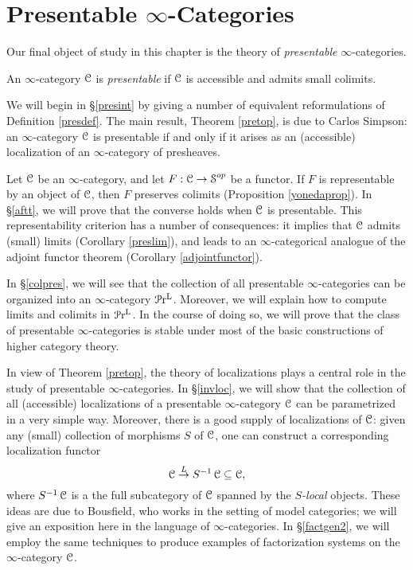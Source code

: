 \section{Presentable $\infty$-Categories}\label{c5s6}

Our final object of study in this chapter is the theory of {\em presentable} $\infty$-categories.

\begin{definition}\label{presdef}
An $\infty$-category $\operatorname{\mathcal{C}}$ is {\it presentable} if $\operatorname{\mathcal{C}}$ is accessible and admits small colimits.
\end{definition}

We will begin in \S \ref{presint} by giving a number of equivalent reformulations of Definition \ref{presdef}. The main result, Theorem \ref{pretop}, is due to Carlos Simpson: an $\infty$-category $\operatorname{\mathcal{C}}$ is presentable if and only if it arises as an (accessible) localization of an $\infty$-category of presheaves. 

Let $\operatorname{\mathcal{C}}$ be an $\infty$-category, and let $F: \operatorname{\mathcal{C}} \rightarrow \operatorname{\mathcal{S}}^{op}$ be a functor. If $F$ is representable by an object of $\operatorname{\mathcal{C}}$, then $F$ preserves colimits (Proposition \ref{yonedaprop}). In \S \ref{aftt}, we will prove that the converse holds when $\operatorname{\mathcal{C}}$ is presentable. This representability criterion has a number of consequences: it implies that $\operatorname{\mathcal{C}}$ admits (small) limits (Corollary \ref{preslim}), and leads to an $\infty$-categorical analogue of the adjoint functor theorem (Corollary \ref{adjointfunctor}).

In \S \ref{colpres}, we will see that the collection of all presentable $\infty$-categories can be organized into an $\infty$-category $\operatorname{\mathcal{P}r^{L}}$. Moreover, we will explain how to compute limits and colimits in $\operatorname{\mathcal{P}r^{L}}$. In the course of doing so, we will prove that the class of presentable $\infty$-categories is stable under most of the basic constructions of higher category theory.

In view of Theorem \ref{pretop}, the theory of localizations plays a central role in the study of presentable $\infty$-categories. In \S \ref{invloc}, we will show that the collection of all (accessible) localizations of a presentable $\infty$-category $\operatorname{\mathcal{C}}$ can be parametrized in a very simple way. Moreover, there is a good supply of localizations of $\operatorname{\mathcal{C}}$: given any (small) collection of morphisms $S$ of $\operatorname{\mathcal{C}}$, one can construct a corresponding localization functor
$$\operatorname{\mathcal{C}} \stackrel{L}{\rightarrow} S^{-1} \operatorname{\mathcal{C}} \subseteq \operatorname{\mathcal{C}},$$
where $S^{-1} \operatorname{\mathcal{C}}$ is a the full subcategory of $\operatorname{\mathcal{C}}$ spanned by the {\it $S$-local} objects.
These ideas are due to Bousfield, who works in the setting of model categories; we will give an exposition here in the language of $\infty$-categories. In \S \ref{factgen2}, we will employ the same techniques to produce examples of factorization systems on the $\infty$-category $\operatorname{\mathcal{C}}$.


